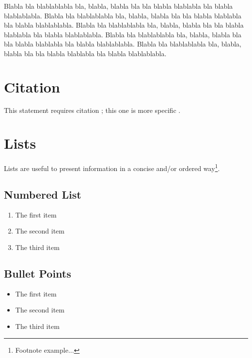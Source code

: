 \documentclass{udc-book}
\begin{document}
Blabla bla blablablabla bla, blabla, blabla bla bla blabla blablabla bla blabla
blablablabla.  Blabla bla blablablabla bla, blabla, blabla bla bla blabla
blablabla bla blabla blablablabla.  Blabla bla blablablabla bla, blabla, blabla
bla bla blabla blablabla bla blabla blablablabla.  Blabla bla blablablabla bla,
blabla, blabla bla bla blabla blablabla bla blabla blablablabla.  Blabla bla
blablablabla bla, blabla, blabla bla bla blabla blablabla bla blabla
blablablabla.


\section{Citation}

This statement requires citation \cite{book_key}; this one is more specific
\cite[122]{article_key}.


\section{Lists}

Lists are useful to present information in a concise and/or ordered
way\footnote{Footnote example...}.

\subsection{Numbered List}

\begin{enumerate}
\item The first item
\item The second item
\item The third item
\end{enumerate}

\subsection{Bullet Points}

\begin{itemize}
\item The first item
\item The second item
\item The third item
\end{itemize}
\end{document}
